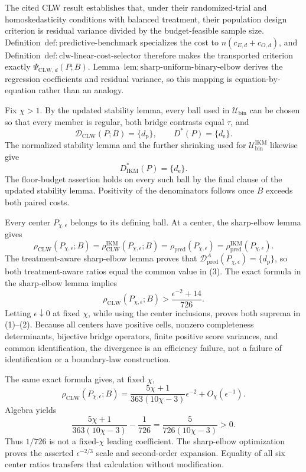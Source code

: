 The cited CLW result establishes that, under their randomized-trial and homoskedasticity conditions with balanced treatment, their population design criterion is residual variance divided by the budget-feasible sample size. Definition~\(\mathrm{def{:}predictive\text{-}benchmark}\) specializes the cost to \(n(c_{E,d}+c_{O,d})\), and Definition~\(\mathrm{def{:}clw\text{-}linear\text{-}cost\text{-}selector}\) therefore makes the transported criterion exactly \(\Psi_{\mathrm{CLW},d}(P;B)\). Lemma~\(\mathrm{lem{:}sharp\text{-}uniform\text{-}binary\text{-}elbow}\) derives the regression coefficients and residual variance, so this mapping is equation-by-equation rather than an analogy.

Fix \(\chi>1\). By the updated stability lemma, every ball used in \(\mathcal U_{\mathrm{bin}}\) can be chosen so that every member is regular, both bridge contrasts equal \(\tau\), and
\[
 \mathcal D_{\mathrm{CLW}}(P;B)=\{d_{\mathrm p}\},
 \qquad D^*(P)=\{d_{\mathrm e}\}.                         \tag{1}
\]
The normalized stability lemma and the further shrinking used for \(\mathcal U_{\mathrm{bin}}^{\mathrm{IKM}}\) likewise give
\[
 D_{\mathrm{IKM}}^*(P)=\{d_{\mathrm e}\}.                \tag{2}
\]
The floor-budget assertion holds on every such ball by the final clause of the updated stability lemma. Positivity of the denominators follows once \(B\) exceeds both paired costs.

Every center \(P_{\chi,\epsilon}\) belongs to its defining ball. At a center, the sharp-elbow lemma gives
\[
 \rho_{\mathrm{CLW}}(P_{\chi,\epsilon};B)
 =\rho_{\mathrm{CLW}}^{\mathrm{IKM}}(P_{\chi,\epsilon};B)
 =\rho_{\mathrm{pred}}(P_{\chi,\epsilon})
 =\rho_{\mathrm{pred}}^{\mathrm{IKM}}(P_{\chi,\epsilon}). \tag{3}
\]
The treatment-aware sharp-elbow lemma proves that \(\mathcal D_{\mathrm{pred}}^A(P_{\chi,\epsilon})=\{d_{\mathrm p}\}\), so both treatment-aware ratios equal the common value in (3). The exact formula in the sharp-elbow lemma implies
\[
 \rho_{\mathrm{CLW}}(P_{\chi,\epsilon};B)
 >\frac{\epsilon^{-2}+14}{726}.                            \tag{4}
\]
Letting \(\epsilon\downarrow0\) at fixed \(\chi\), while using the center inclusions, proves both suprema in (1)--(2). Because all centers have positive cells, nonzero completeness determinants, bijective bridge operators, finite positive score variances, and common identification, the divergence is an efficiency failure, not a failure of identification or a boundary-law construction.

The same exact formula gives, at fixed \(\chi\),
\[
 \rho_{\mathrm{CLW}}(P_{\chi,\epsilon};B)
 =\frac{5\chi+1}{363(10\chi-3)}\epsilon^{-2}+O_\chi(\epsilon^{-1}). \tag{5}
\]
Algebra yields
\[
 \frac{5\chi+1}{363(10\chi-3)}-\frac1{726}
 =\frac5{726(10\chi-3)}>0.
\]
Thus \(1/726\) is not a fixed-\(\chi\) leading coefficient. The sharp-elbow optimization proves the asserted \(\epsilon^{-2/3}\) scale and second-order expansion. Equality of all six center ratios transfers that calculation without modification.

